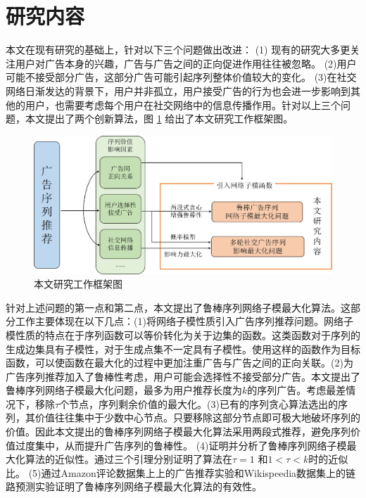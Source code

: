 \section{研究内容}

本文在现有研究的基础上，针对以下三个问题做出改进：
(1) 现有的研究大多更关注用户对广告本身的兴趣，广告与广告之间的正向促进作用往往被忽略。
(2)用户可能不接受部分广告，这部分广告可能引起序列整体价值较大的变化。
(3)在社交网络日渐发达的背景下，用户并非孤立，用户接受广告的行为也会进一步影响到其他的用户，也需要考虑每个用户在社交网络中的信息传播作用。针对以上三个问题，本文提出了两个创新算法，图 \ref{fig:frame} 给出了本文研究工作框架图。

\begin{figure}[th]
    \centering
    \includegraphics[width=.89\linewidth]{figure/frame}
    \caption{本文研究工作框架图}
    \label{fig:frame}
\end{figure}


针对上述问题的第一点和第二点，本文提出了鲁棒序列网络子模最大化算法。这部分工作主要体现在以下几点：(1)将网络子模性质引入广告序列推荐问题。网络子模性质的特点在于序列函数可以等价转化为关于边集的函数。这类函数对于序列的生成边集具有子模性，对于生成点集不一定具有子模性。使用这样的函数作为目标函数，可以使函数在最大化的过程中更加注重广告与广告之间的正向关联。(2)为广告序列推荐加入了鲁棒性考虑，用户可能会选择性不接受部分广告。本文提出了鲁棒序列网络子模最大化问题，最多为用户推荐长度为$k$的序列广告。考虑最差情况下，移除$\tau$个节点，序列剩余价值的最大化。(3)已有的序列贪心算法\cite{tschiatschek2017selecting,mitrovic2018submodularity}选出的序列，其价值往往集中于少数中心节点。只要移除这部分节点即可极大地破坏序列的价值。因此本文提出的鲁棒序列网络子模最大化算法采用两段式推荐，避免序列价值过度集中，从而提升广告序列的鲁棒性。
(4)证明并分析了鲁棒序列网络子模最大化算法的近似性。通过三个引理分别证明了算法在$\tau = 1$ 和$1< \tau < k$时的近似比。
(5)通过Amazon评论数据集上\cite{ni2019justifying}上的广告推荐实验和Wikispeedia数据集\cite{west2009wikispeedia}上的链路预测实验证明了鲁棒序列网络子模最大化算法的有效性。

